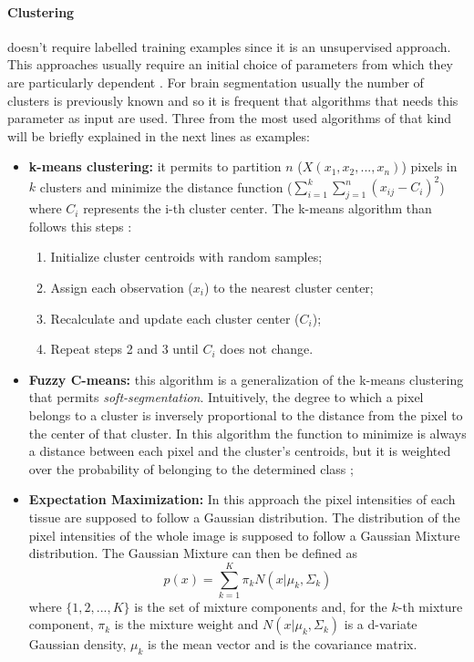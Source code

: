 \documentclass{standalone}
\begin{document}
\paragraph{Clustering}
doesn't require labelled training examples since it is an unsupervised approach. This approaches usually require an initial choice of parameters from which they are particularly dependent \cite{ART:Pham, mastersthesis:Biondi}.
For brain segmentation usually the number of clusters is previously known and so it is frequent that algorithms that needs this parameter as input are used. Three from the most used algorithms of that kind will be briefly explained in the next lines as examples:
\begin{itemize}
	
		\item \textbf{k-means clustering:} it permits to partition $n$ ($X(x_1,x_2,...,x_n)$) pixels in $k$ clusters and minimize the distance function 
		($\sum_{i=1}^{k} \sum_{j=1}^{n} ( x_{ij}-C_{i} )^2 $) where $C_i$ represents the i-th cluster center.
		The k-means algorithm than follows this steps \cite{ART:Qiao}:
		\begin{enumerate}
		    \item Initialize cluster centroids with random samples;
		    \item Assign each observation ($x_i$) to the nearest cluster center;
		    \item Recalculate and update each cluster center ($C_i$);
		    \item Repeat steps 2 and 3 until $C_i$ does not change.
		\end{enumerate} 
		
		\item \textbf{Fuzzy C-means: } this algorithm is a generalization of the k-means clustering that permits \textit{soft-segmentation}. Intuitively, the degree to which a pixel belongs to a cluster is inversely proportional to the distance from the pixel to the center of that cluster. In this algorithm the function to minimize is always a distance between each pixel and the cluster's centroids, but it is weighted over the probability of belonging to the determined class \cite{ART:Lauric};
		
		\item \textbf{Expectation Maximization:} In this approach the pixel intensities of each tissue are supposed to follow a Gaussian distribution. The distribution of the pixel intensities of the whole image is supposed to follow a Gaussian Mixture distribution. The Gaussian Mixture can then be defined as 
  \begin{equation}
      p(x) = \sum_{k=1}^K \pi_k N(x|\mu_k, \Sigma_k)
  \end{equation} \label{EQ:GaussianMixture}
        where $\{1, 2, ..., K\}$ is the set of mixture components and, for the $k$-th mixture component, $\pi_k$ is the mixture weight and $ N(x|\mu_k, \Sigma_k)$ is a d-variate Gaussian density, $\mu_k$ is the mean vector and is the covariance matrix.


\end{itemize}
\end{document}
